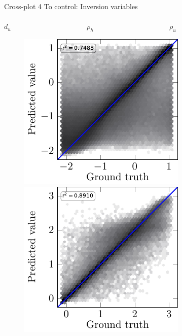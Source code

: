 \begin{frame}{Cross-plot 4}
\centering
\setlength{\fboxrule}{0.5mm}
\setlength{\fboxsep}{1mm}
\color{red}
\color{black}
To control: Inversion variables \\
$\qquad$ \\
\hspace{0.5cm} $d_u$ $\qquad \qquad \qquad \qquad \qquad$ $\rho_h$ $\qquad \qquad \qquad \qquad \qquad$ $\rho_u$
\begin{figure}[!h]
\centering
	{%
		\includegraphics[scale=0.85]{Diapos/DL_For_Inv/Figures/Syn_example/Cross_plots/C_P_4/d_u/3_d_u_axis.pdf}
		\hspace{0.1cm}
		\includegraphics[scale=0.85]{Diapos/DL_For_Inv/Figures/Syn_example/Cross_plots/C_P_4/rho_h/15_rho_h_axis.pdf}
		\hspace{0.1cm}
}
\end{figure}
\end{frame}

